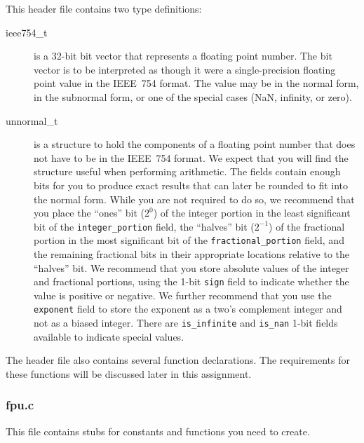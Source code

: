 This header file contains two type definitions:
\begin{description}
    \item[ieee754\_t] is a 32-bit bit vector that represents a floating point number.
    The bit vector is to be interpreted as though it were a single-precision floating point value in the IEEE~754 format.
    The value may be in the normal form, in the subnormal form, or one of the special cases (NaN, infinity, or zero).
    \item[unnormal\_t] is a structure to hold the components of a floating point number that does not have to be in the IEEE~754 format.
    We expect that you will find the structure useful when performing arithmetic.
    The fields contain enough bits for you to produce exact results that can later be rounded to fit into the normal form.
    While you are not required to do so, we recommend that you place the ``ones'' bit ($2^0$) of the integer portion in the least significant bit of the \lstinline{integer_portion} field, the ``halves'' bit ($2^{-1}$) of the fractional portion in the most significant bit of the \lstinline{fractional_portion} field, and the remaining fractional bits in their appropriate locations relative to the ``halves'' bit.
    We recommend that you store absolute values of the integer and fractional portions, using the 1-bit \lstinline{sign} field to indicate whether the value is positive or negative.
    We further recommend that you use the \lstinline{exponent} field to store the exponent as a two's complement integer and not as a biased integer.
    There are \lstinline{is_infinite} and \lstinline{is_nan} 1-bit fields available to indicate special values.
\end{description}
The header file also contains several function declarations.
The requirements for these functions will be discussed later in this assignment.

\subsubsection{fpu.c}

This file contains stubs for constants and functions you need to create.
